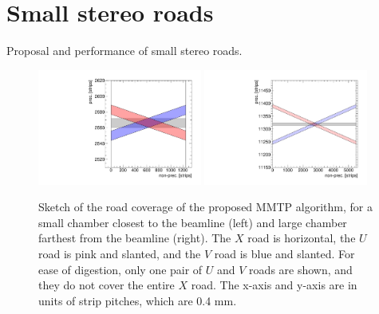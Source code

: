 \section{Small stereo roads}
\label{sec:stereoroads}

Proposal and performance of small stereo roads.

\begin{figure}[!htpb]
  \begin{center}
    \includegraphics[width=0.48\textwidth]{figures/cartoon_roads_small_smallstereo_1.pdf}
    \includegraphics[width=0.48\textwidth]{figures/cartoon_roads_large_smallstereo_1.pdf}
  \end{center}
  \vspace{-10pt}
  \caption{Sketch of the road coverage of the proposed MMTP algorithm, for a small chamber closest to the beamline (left) and large chamber farthest from the beamline (right). The $X$ road is horizontal, the $U$ road is pink and slanted, and the $V$ road is blue and slanted. For ease of digestion, only one pair of $U$ and $V$ roads are shown, and they do not cover the entire $X$ road. The x-axis and y-axis are in units of strip pitches, which are 0.4 mm.}
  \label{fig:cartoon_smallroads_1}
\end{figure}

